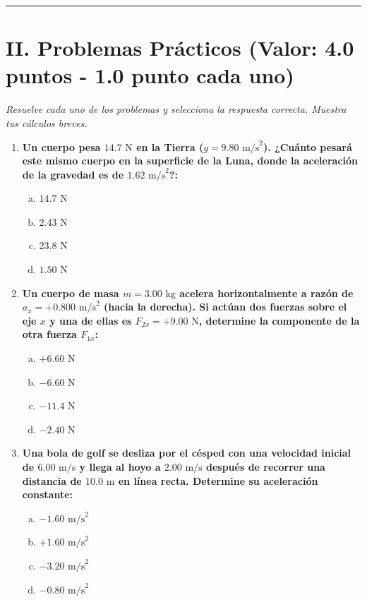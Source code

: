 \documentclass[11pt,a4paper]{article}
\begin{document}
\hrule
\section*{II. Problemas Prácticos (Valor: 4.0 puntos - 1.0 punto cada uno)}
\textit{Resuelve cada uno de los problemas y selecciona la respuesta correcta. Muestra tus cálculos breves.}

\begin{enumerate}
    \item \textbf{Un cuerpo pesa $14.7 \text{ N}$ en la Tierra ($g = 9.80 \text{ m/s}^2$). ¿Cuánto pesará este mismo cuerpo en la superficie de la Luna, donde la aceleración de la gravedad es de $1.62 \text{ m/s}^2$?:}
    \begin{enumerate}[a)]
        \item $14.7 \text{ N}$
        \item $2.43 \text{ N}$
        \item $23.8 \text{ N}$
        \item $1.50 \text{ N}$
    \end{enumerate}

    \item \textbf{Un cuerpo de masa $m = 3.00 \text{ kg}$ acelera horizontalmente a razón de $a_x = +0.800 \text{ m/s}^2$ (hacia la derecha). Si actúan dos fuerzas sobre el eje $x$ y una de ellas es $F_{2x} = +9.00 \text{ N}$, determine la componente de la otra fuerza $F_{1x}$:}
    \begin{enumerate}[a)]
        \item $+6.60 \text{ N}$
        \item $-6.60 \text{ N}$
        \item $-11.4 \text{ N}$
        \item $-2.40 \text{ N}$
    \end{enumerate}

    \item \textbf{Una bola de golf se desliza por el césped con una velocidad inicial de $6.00 \text{ m/s}$ y llega al hoyo a $2.00 \text{ m/s}$ después de recorrer una distancia de $10.0 \text{ m}$ en línea recta. Determine su aceleración constante:}
    \begin{enumerate}[a)]
        \item $-1.60 \text{ m/s}^2$
        \item $+1.60 \text{ m/s}^2$
        \item $-3.20 \text{ m/s}^2$
        \item $-0.80 \text{ m/s}^2$
    \end{enumerate}


\end{enumerate}
\end{document}
